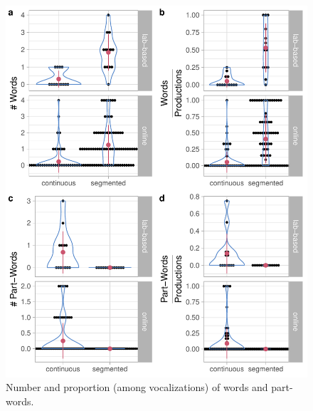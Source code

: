 \documentclass[
]{article}
\begin{document}
\begin{figure}

{\centering \includegraphics[width=0.8\linewidth]{segmentation_recall_combined_for_revision_files/figure-latex/recall-words-part-words-raw-plot-1} 

}

\caption{Number and proportion (among vocalizations) of words and part-words.}\label{fig:recall-words-part-words-raw-plot}
\end{figure}
\end{document}
